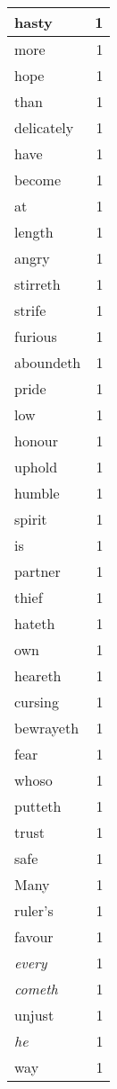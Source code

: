 \begin{center}
\begin{longtable}{l|r}
hasty & 1\\ \hline 
more & 1\\ \hline 
hope & 1\\ \hline 
than & 1\\ \hline 
delicately & 1\\ \hline 
have & 1\\ \hline 
become & 1\\ \hline 
at & 1\\ \hline 
length & 1\\ \hline 
angry & 1\\ \hline 
stirreth & 1\\ \hline 
strife & 1\\ \hline 
furious & 1\\ \hline 
aboundeth & 1\\ \hline 
pride & 1\\ \hline 
low & 1\\ \hline 
honour & 1\\ \hline 
uphold & 1\\ \hline 
humble & 1\\ \hline 
spirit & 1\\ \hline 
is & 1\\ \hline 
partner & 1\\ \hline 
thief & 1\\ \hline 
hateth & 1\\ \hline 
own & 1\\ \hline 
heareth & 1\\ \hline 
cursing & 1\\ \hline 
bewrayeth & 1\\ \hline 
fear & 1\\ \hline 
whoso & 1\\ \hline 
putteth & 1\\ \hline 
trust & 1\\ \hline 
safe & 1\\ \hline 
Many & 1\\ \hline 
ruler's & 1\\ \hline 
favour & 1\\ \hline 
\emph{every} & 1\\ \hline 
\emph{cometh} & 1\\ \hline 
unjust & 1\\ \hline 
\emph{he} & 1\\ \hline 
way & 1\\ \hline 
\end{longtable}  
\end{center}  



